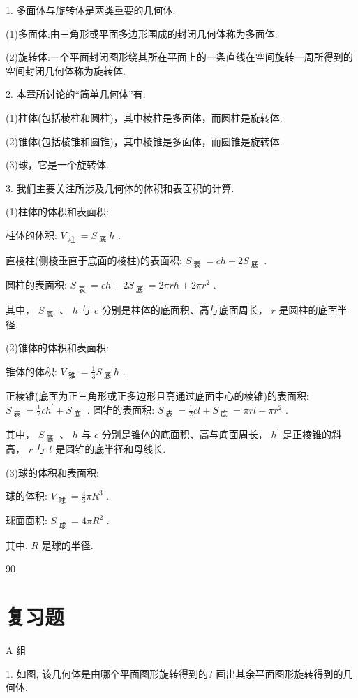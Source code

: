 \documentclass[10pt]{article}
\begin{document}
1. 多面体与旋转体是两类重要的几何体.

(1)多面体:由三角形或平面多边形围成的封闭几何体称为多面体.

(2)旋转体:一个平面封闭图形绕其所在平面上的一条直线在空间旋转一周所得到的空间封闭几何体称为旋转体.

2. 本章所讨论的“简单几何体”有:

(1)柱体(包括棱柱和圆柱)，其中棱柱是多面体，而圆柱是旋转体.

(2)锥体(包括棱锥和圆锥)，其中棱锥是多面体，而圆锥是旋转体.

(3)球，它是一个旋转体.

3. 我们主要关注所涉及几何体的体积和表面积的计算.

(1)柱体的体积和表面积:

柱体的体积: \({V}_{\text{ 柱 }} = {S}_{\text{ 底 }}h\) .

直棱柱(侧棱垂直于底面的棱柱)的表面积: \({S}_{\text{ 表 }} = {ch} + 2{S}_{\text{ 底 }}\) .

圆柱的表面积: \({S}_{\text{ 表 }} = {ch} + 2{S}_{\text{ 底 }} = {2\pi rh} + {{2\pi }{r}^{2}}\) .

其中， \({S}_{\text{ 底 }}\) 、 \(h\) 与 \(c\) 分别是柱体的底面积、高与底面周长， \(r\) 是圆柱的底面半径.

(2)锥体的体积和表面积:

锥体的体积: \({V}_{\text{ 锥 }} = \frac{1}{3}{S}_{\text{ 底 }}h\) .

正棱锥(底面为正三角形或正多边形且高通过底面中心的棱锥)的表面积: \({S}_{\text{ 表 }} = \frac{1}{2}c{h}^{\prime } + {S}_{\text{ 底 }}\) . 圆锥的表面积: \({S}_{\text{ 表 }} = \frac{1}{2}{cl} + {S}_{\text{ 底 }} = {\pi rl} + {\pi {r}^{2}}\) .

其中， \({S}_{\text{ 底 }}\) 、 \(h\) 与 \(c\) 分别是锥体的底面积、高与底面周长， \({h}^{\prime }\) 是正棱锥的斜高， \(r\) 与 \(l\) 是圆锥的底半径和母线长.

(3)球的体积和表面积:

球的体积: \({V}_{\text{ 球 }} = \frac{4}{3}\pi {R}^{3}\) .

球面面积: \({S}_{\text{ 球 }} = {4\pi }{R}^{2}\) .

其中, \(R\) 是球的半径.

90

\section*{复习题}

A 组

1. 如图, 该几何体是由哪个平面图形旋转得到的? 画出其余平面图形旋转得到的几何体.
\end{document}
